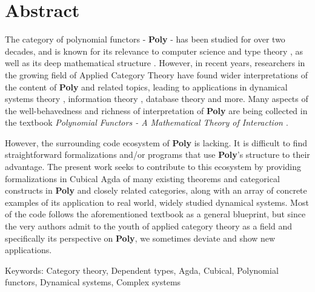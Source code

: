 
\thispagestyle{plain}			%
\section*{Abstract}
The category of polynomial functors - \textbf{Poly} - has been studied for over two decades, and is known for its relevance to computer science and type theory \cite{containers https://www.cs.le.ac.uk/people/ma139/docs/thesis.pdf}, as well as its deep mathematical structure \cite{koch https://arxiv.org/abs/0906.4931}. However, in recent years, researchers in the growing field of Applied Category Theory have found wider interpretations of the content of \textbf{Poly} and related topics, leading to applications in dynamical systems theory \cite{jaz http://davidjaz.com/Papers/DynamicalBook.pdf}, information theory \cite{https://arxiv.org/pdf/2201.12878.pdf}, database theory \cite{spivak db https://arxiv.org/pdf/2111.10968.pdf} and more. Many aspects of the well-behavedness and richness of interpretation of \textbf{Poly} are being collected in the textbook \textit{Polynomial Functors - A Mathematical Theory of Interaction \cite{poly-book}}.

However, the surrounding code ecosystem of \textbf{Poly} is lacking. It is difficult to find straightforward formalizations and/or programs that use \textbf{Poly}'s structure to their advantage. The present work seeks to contribute to this ecosystem by providing formalizations in Cubical Agda of many existing theorems and categorical constructs in \textbf{Poly} and closely related categories, along with an array of concrete examples of its application to real world, widely studied dynamical systems. Most of the code follows the aforementioned textbook as a general blueprint, but since the very authors admit to the youth of applied category theory as a field and specifically its perspective on \textbf{Poly}, we sometimes deviate and show new applications.

\vfill
Keywords: Category theory, Dependent types, Agda, Cubical, Polynomial functors, Dynamical systems, Complex systems

\newpage				%
\thispagestyle{empty}
\mbox{}